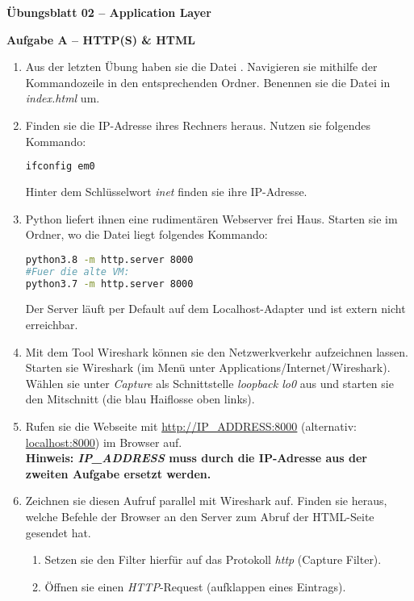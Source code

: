 \documentclass[paper=a4,fontsize=11pt]{scrartcl}%
\numberwithin{equation}{section}
\begin{document}
\begin{center}
\Large{\textbf{Übungsblatt 02 --  Application Layer}}
\end{center}

\begin{center}\Large{\textbf{Aufgabe A -- HTTP(S) \& HTML}}\end{center}\vskip0.25in
\begin{enumerate}
	\item Aus der letzten Übung haben sie die Datei . Navigieren sie mithilfe der Kommandozeile in den entsprechenden Ordner. Benennen sie die Datei in \emph{index.html} um.
	\item Finden sie die IP-Adresse ihres Rechners heraus. Nutzen sie folgendes Kommando:
		\begin{lstlisting}[style=Bash, language=Bash]
ifconfig em0
\end{lstlisting}
		Hinter dem Schlüsselwort \emph{inet} finden sie ihre IP-Adresse.
	\item Python liefert ihnen eine rudimentären Webserver frei Haus. Starten sie im Ordner, wo die  Datei liegt folgendes Kommando:
		\begin{lstlisting}[style=Bash, language=Bash]
python3.8 -m http.server 8000
#Fuer die alte VM:
python3.7 -m http.server 8000
		\end{lstlisting}
		Der Server läuft per Default auf dem Localhost-Adapter und ist extern nicht erreichbar.
	\item Mit dem Tool Wireshark können sie den Netzwerkverkehr aufzeichnen lassen. Starten sie Wireshark (im Menü unter Applications/Internet/Wireshark). Wählen sie unter \emph{Capture} als Schnittstelle \emph{loopback lo0} aus und starten sie den Mitschnitt (die blau Haiflosse oben links).
	\item Rufen sie die Webseite mit \url{http://IP_ADDRESS:8000} (alternativ: \url{localhost:8000}) im Browser auf. \\ \textbf{Hinweis: \textit{IP\_ADDRESS} muss durch die IP-Adresse aus der zweiten Aufgabe ersetzt werden.}
	\item Zeichnen sie diesen Aufruf parallel mit Wireshark auf. Finden sie heraus, welche Befehle der Browser an den Server zum  Abruf der HTML-Seite gesendet hat.
	\begin{enumerate}
		\item Setzen sie den Filter hierfür auf das Protokoll \emph{http} (Capture Filter).
		\item Öffnen sie einen \emph{HTTP}-Request (aufklappen eines Eintrags).

\end{enumerate}
\end{enumerate}
\end{document}
